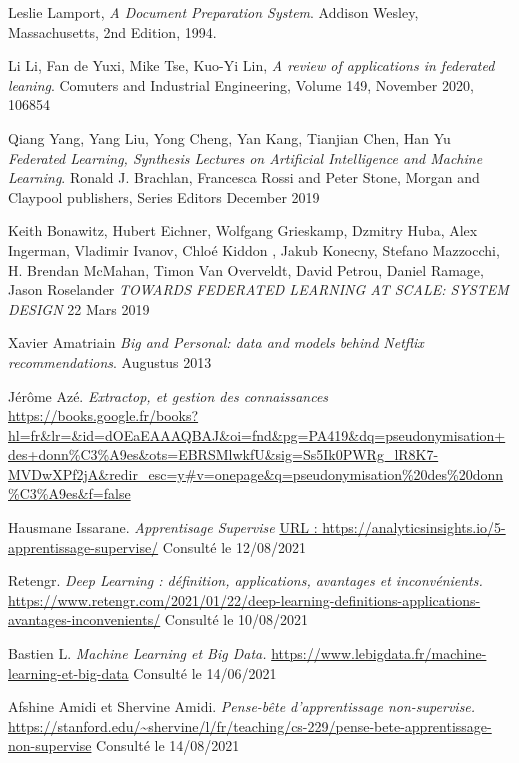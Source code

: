 \documentclass[12pt,a4paper,french]{report}
\begin{document}
\begin{thebibliography}{9}

	  Leslie Lamport,
	  \emph{A Document Preparation System}.
	  Addison Wesley, Massachusetts,
	  2nd Edition,
	  1994.
	  
	  Li Li, Fan de Yuxi, Mike Tse, Kuo-Yi Lin,
	  \emph{A review of applications in federated leaning}.
	  Comuters and Industrial Engineering,
	  Volume 149,
	  November 2020,
	  106854
	  
	  Qiang Yang, Yang Liu, Yong Cheng, Yan Kang, Tianjian Chen, Han Yu
	  \emph{Federated Learning, Synthesis Lectures on Artificial Intelligence and Machine Learning}.
	  Ronald J. Brachlan, Francesca Rossi and Peter Stone,
	  Morgan and Claypool publishers,
	  Series Editors
	  December 2019
	  
	  Keith Bonawitz, Hubert Eichner, Wolfgang Grieskamp, Dzmitry Huba, Alex Ingerman, Vladimir Ivanov, Chloé Kiddon , Jakub Konecny,  Stefano Mazzocchi, H. Brendan McMahan, Timon Van Overveldt, David Petrou, Daniel Ramage, Jason Roselander
       \emph{TOWARDS FEDERATED LEARNING AT SCALE: SYSTEM DESIGN} 22 Mars 2019  
	  	  
	  Xavier Amatriain
	  \emph{Big and Personal: data and models behind Netflix recommendations}.
	  Augustus 2013
	  
	  Jérôme Azé.
	  \emph{Extractop, et gestion des connaissances}
	  \url{https://books.google.fr/books?hl=fr&lr=&id=dOEaEAAAQBAJ&oi=fnd&pg=PA419&dq=pseudonymisation+des+donn%C3%A9es&ots=EBRSMlwkfU&sig=Ss5Ik0PWRg_lR8K7-MVDwXPf2jA&redir_esc=y#v=onepage&q=pseudonymisation%20des%20donn%C3%A9es&f=false}
	  
	  Hausmane Issarane.
	  \emph{Apprentisage Supervise}
	  \url{URL : https://analyticsinsights.io/5-apprentissage-supervise/} Consulté le 12/08/2021
		  
	  Retengr.
	  \emph{Deep Learning : définition, applications, avantages et inconvénients.}
	  \url {https://www.retengr.com/2021/01/22/deep-learning-definitions-applications-avantages-inconvenients/}
	  Consulté le 10/08/2021
	  
	Bastien L.
	\emph{Machine Learning et Big Data.}
	\url {https://www.lebigdata.fr/machine-learning-et-big-data} Consulté le 14/06/2021
	
	Afshine Amidi et Shervine Amidi.
	\emph{Pense-bête d'apprentissage non-supervise.}
	\url{https://stanford.edu/~shervine/l/fr/teaching/cs-229/pense-bete-apprentissage-non-supervise} Consulté le 14/08/2021

\end{thebibliography}
\end{document}
